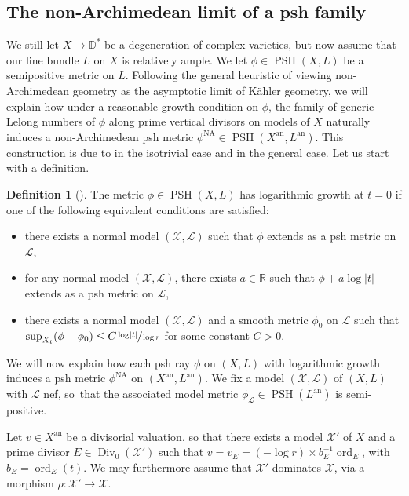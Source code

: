 \documentclass[JEP,XML,SOM,Unicode,published]{cedram}
\theoremstyle{definition}
\newtheorem{defn}[equation]{Definition}
\newcommand \D {\mathbb{D}}
\newcommand \R{\mathbb R}
\newcommand \Ld {\mathscr {L}}
\newcommand \X {\mathscr{X}}
\newcommand{\an}{\mathrm{an}}
\DeclareMathOperator \Div {Div}
\DeclareMathOperator{\NA}{NA}
\DeclareMathOperator{\ord}{ord}
\DeclareMathOperator{\PSH}{PSH}
\begin{document}
\subsection{The non-Archimedean limit of a psh family} \label{sec psh na}
We still let $X \to \D^*$ be a degeneration of complex varieties, but now assume that our line bundle $L$ on $X$ is relatively ample. We let $\phi \in \PSH(X, L)$ be a semipositive metric on $L$. Following the general heuristic of viewing non-Archimedean geometry as the asymptotic limit of Kähler geometry, we will explain how under a reasonable growth condition on $\phi$, the family of generic Lelong numbers of $\phi$ along prime vertical divisors on models of $X$ naturally induces a non-Archimedean psh metric $\phi^{\NA} \in \PSH(X^{\an}, L^{\an})$. This construction is due to \cite{BBJ} in the isotrivial case and \cite{Reb} in the general case. Let us start with a definition.
\begin{defn}[{\cite[Lem.\,2.3.2]{Reb}}] \label{def log g} The metric $\phi \in \PSH(X,L)$ has logarithmic growth at $t=0$ if one of the following equivalent conditions are satisfied:
\begin{itemize}
\item there exists a normal model $(\X, \Ld)$ such that $\phi$ extends as a psh metric on $\Ld$,
\item for any normal model $(\X, \Ld)$, there exists $a \in \R$ such that $\phi + a \log \lvert t \rvert$ extends as a psh metric on $\Ld$,
\item there exists a normal model $(\X, \Ld)$ and a smooth metric $\phi_0$ on $\Ld$ such that $\sup_{X_t} (\phi - \phi_0) \le C \sfrac{\log \lvert t \rvert}{\log r}$ for some constant $C>0$.
\end{itemize}
\end{defn}
We will now explain how each psh ray $\phi$ on $(X, L)$ with logarithmic growth induces a psh metric $\phi^{\NA}$ on $(X^{\an}, L^{\an})$. We fix a model $(\X, \Ld)$ of $(X, L)$ with $\Ld$ nef, so~that the associated model metric $\phi_{\Ld} \in \PSH(L^{\an})$ is semi-positive.

Let $v \in X^{\an}$ be a divisorial valuation, so that there exists a model $\X'$ of $X$ and a prime divisor $E \in \Div_0(\X')$ such that $v =v_E= (-\log r) \times b_E^{-1} \ord_E$, with $b_E = \ord_E(t)$. We may furthermore assume that $\X'$ dominates $\X$, via a morphism $\rho: \X' \to \X$.
\end{document}
